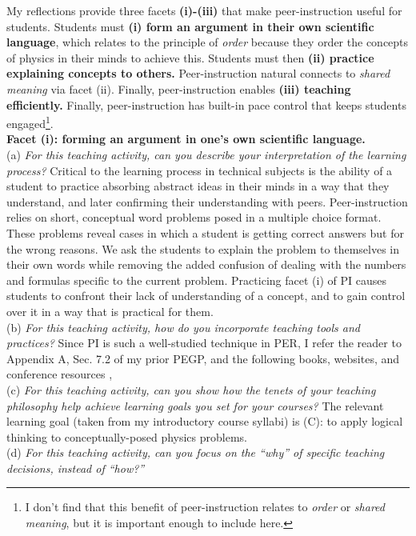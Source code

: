 \documentclass[../../../main.tex]{subfiles}
\begin{document}
My reflections provide three facets \textbf{(i)-(iii)} that make peer-instruction useful for students.  Students must \textbf{(i) form an argument in their own scientific language}, which relates to the principle of \textit{order} because they order the concepts of physics in their minds to achieve this.  Students must then \textbf{(ii) practice explaining concepts to others.}  Peer-instruction natural connects to \textit{shared meaning} via facet (ii).  Finally, peer-instruction enables \textbf{(iii) teaching efficiently.}  Finally, peer-instruction has built-in pace control that keeps students engaged\footnote{I don't find that this benefit of peer-instruction relates to \textit{order} or \textit{shared meaning}, but it is important enough to include here.}.
\\
\vspace{0.25cm}
\textbf{Facet (i): forming an argument in one's own scientific language.}
\\
\vspace{0.25cm}
(a) \textit{For this teaching activity, can you describe your interpretation of the learning process?}  Critical to the learning process in technical subjects is the ability of a student to practice absorbing abstract ideas in their minds in a way that they understand, and later confirming their understanding with peers.  Peer-instruction relies on short, conceptual word problems posed in a multiple choice format.  These problems reveal cases in which a student is getting correct answers but for the wrong reasons.  We ask the students to explain the problem to themselves in their own words while removing the added confusion of dealing with the numbers and formulas specific to the current problem.  Practicing facet (i) of PI causes students to confront their lack of understanding of a concept, and to gain control over it in a way that is practical for them.
\\
\vspace{0.25cm}
(b) \textit{For this teaching activity, how do you incorporate teaching tools and practices?}  Since PI is such a well-studied technique in PER, I refer the reader to Appendix A, Sec. 7.2 of my prior PEGP, and the following books, websites, and conference resources \cite{mazur2013peer,PhysPort,AAPTPI}, 
\\
\vspace{0.25cm}
(c) \textit{For this teaching activity, can you show how the tenets of your teaching philosophy help achieve learning goals you set for your courses?}  The relevant learning goal (taken from my introductory course syllabi) is (C): to apply logical thinking to conceptually-posed physics problems.
\\
\vspace{0.25cm}
(d) \textit{For this teaching activity, can you focus on the ``why'' of specific teaching decisions, instead of ``how?''}
\\
\vspace{0.25cm}
\end{document}
